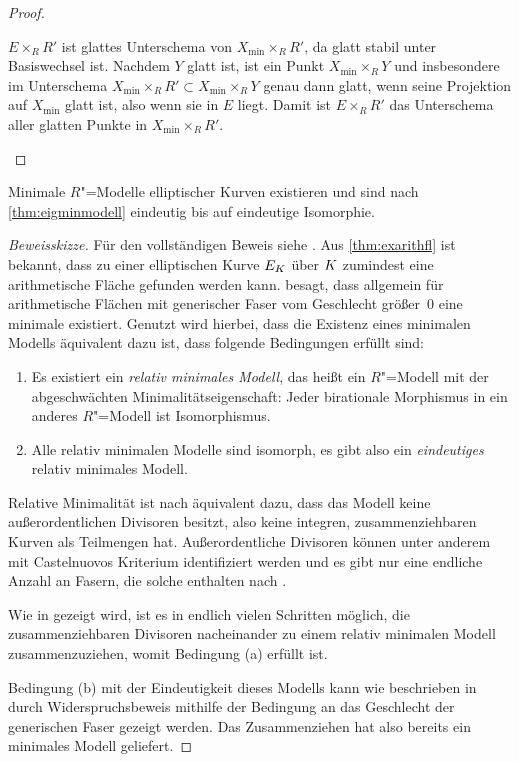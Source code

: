 \begin{Satz}
\begin{proof}
\begin{enumerate}[resume*,start=1]
      $E\times_R R'$ ist glattes Unterschema von
      ${X_{\text{min}}\times_R R'}$, da glatt stabil unter Basiswechsel
      ist. Nachdem $Y$ glatt ist, ist ein Punkt 
      ${X_{\text{min}}\times_R Y}$ und insbesondere im Unterschema
      ${X_{\text{min}}\times_R R'\subset X_{\text{min}}\times_R Y}$
      genau dann glatt, wenn seine Projektion auf $X_{\text{min}}$
      glatt ist, also wenn sie in $E$ liegt. Damit ist ${E\times_R R'}$
      das Unterschema aller glatten Punkte in
      ${X_{\text{min}}\times_R R'}$.
      \qedhere
    \end{enumerate}
  \end{proof}
\end{Satz}

\begin{Satz}\label{thm:exminmodell}
  Minimale $R$"=Modelle elliptischer Kurven existieren und sind nach
  \ref{thm:eigminmodell} eindeutig bis auf eindeutige Isomorphie.
  \begin{proof}[Beweisskizze]
    Für den vollständigen Beweis siehe \cite[Theorem~9.3.21]{liu}.
    Aus \ref{thm:exarithfl} ist bekannt, dass zu einer elliptischen
    Kurve $E_{K}$ über $K$ zumindest eine arithmetische Fläche
    gefunden werden kann.
    \cite[Theorem~9.3.21]{liu} besagt, dass allgemein für
    arithmetische Flächen mit generischer Faser vom Geschlecht
    größer~0 eine minimale existiert.
    Genutzt wird hierbei, dass die Existenz eines minimalen Modells
    äquivalent dazu ist, dass folgende Bedingungen erfüllt sind:
    \begin{enumerate}[label=(\alph*)]
    \item Es existiert ein \emph{relativ minimales Modell}, das heißt
      ein $R$"=Modell mit der abgeschwächten Minimalitätseigenschaft:
      Jeder birationale Morphismus in ein anderes $R$"=Modell ist
      Isomorphismus.
    \item Alle relativ minimalen Modelle sind isomorph, es gibt also
      ein \emph{eindeutiges} relativ minimales Modell.
    \end{enumerate}
    Relative Minimalität ist nach \cite[Theorem~9.2.2]{liu} äquivalent
    dazu, dass das Modell keine außerordentlichen Divisoren besitzt,
    also keine integren, zusammenziehbaren Kurven als Teilmengen
    hat.
    Außerordentliche Divisoren können unter anderem mit Castelnuovos
    Kriterium \cite[Theorem~9.3.8]{liu} identifiziert werden und es
    gibt nur eine endliche Anzahl an Fasern, die solche enthalten nach
    \cite[Lemma~9.3.17]{liu}.

    Wie in \cite[Proposition~9.3.19]{liu} gezeigt wird, ist es in
    endlich vielen Schritten möglich, die zusammenziehbaren Divisoren
    nacheinander zu einem relativ minimalen Modell zusammenzuziehen,
    womit Bedingung (a) erfüllt ist.

    Bedingung (b) mit der Eindeutigkeit dieses Modells kann wie
    beschrieben in \cite[Theorem~9.3.21]{liu} durch
    Widerspruchsbeweis mithilfe der Bedingung an das Geschlecht der
    generischen Faser gezeigt werden.
    Das Zusammenziehen hat also bereits ein minimales Modell geliefert.
  \end{proof}
\end{Satz}

